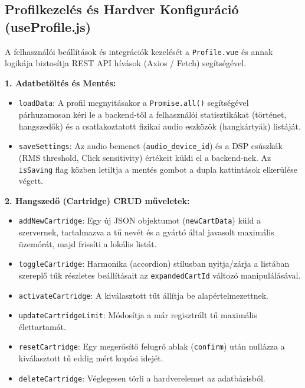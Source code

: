 \subsection{Profilkezelés és Hardver Konfiguráció (useProfile.js)}
A felhasználói beállítások és integrációk kezelését a \texttt{Profile.vue} és annak logikája biztosítja REST API hívások (Axios / Fetch) segítségével.

\textbf{1. Adatbetöltés és Mentés:}
\begin{itemize}
    \item \texttt{loadData}: A profil megnyitásakor a \texttt{Promise.all()} segítségével párhuzamosan kéri le a backend-től a felhasználói statisztikákat (történet, hangszedők) és a csatlakoztatott fizikai audio eszközök (hangkártyák) listáját.
    \item \texttt{saveSettings}: Az audio bemenet (\texttt{audio\_device\_id}) és a DSP csúszkák (RMS threshold, Click sensitivity) értékeit küldi el a backend-nek. Az \texttt{isSaving} flag közben letiltja a mentés gombot a dupla kattintások elkerülése végett.
\end{itemize}

\textbf{2. Hangszedő (Cartridge) CRUD műveletek:}
\begin{itemize}
    \item \texttt{addNewCartridge}: Egy új JSON objektumot (\texttt{newCartData}) küld a szervernek, tartalmazva a tű nevét és a gyártó által javasolt maximális üzemórát, majd frissíti a lokális listát.
    \item \texttt{toggleCartridge}: Harmonika (accordion) stílusban nyitja/zárja a listában szereplő tűk részletes beállításait az \texttt{expandedCartId} változó manipulálásával.
    \item \texttt{activateCartridge}: A kiválasztott tűt állítja be alapértelmezettnek.
    \item \texttt{updateCartridgeLimit}: Módosítja a már regisztrált tű maximális élettartamát.
    \item \texttt{resetCartridge}: Egy megerősítő felugró ablak (\texttt{confirm}) után nullázza a kiválasztott tű eddig mért kopási idejét.
    \item \texttt{deleteCartridge}: Véglegesen törli a hardverelemet az adatbázisból.
\end{itemize}

